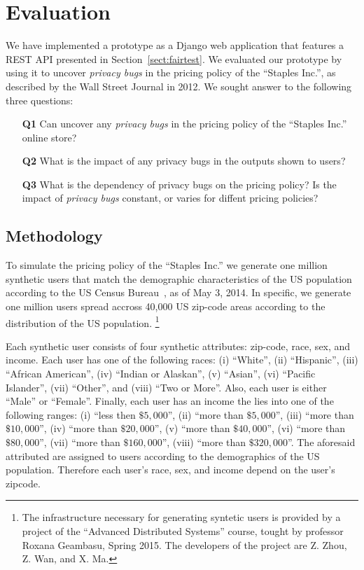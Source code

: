 \section{Evaluation}
\label{sect:evaluation}

We have implemented a \sysname prototype as a Django web application
that features a REST API presented in Section~\ref{sect:fairtest}.
We evaluated our prototype by using it to uncover {\it privacy bugs}
in the pricing policy of the ``Staples Inc.'', as described by the
Wall Street Journal in 2012. We sought answer to the following three
questions:

\begin{enumerate}
  \item[{\bf Q1}] Can \sysname uncover any {\em privacy bugs} in the
    pricing policy of the ``Staples Inc.'' online store?
  \item[{\bf Q2}] What is the impact of any privacy bugs in the outputs
    shown to users?
  \item[{\bf Q3}] What is the dependency of privacy bugs on the 
    pricing policy? Is the impact of {\em privacy bugs} constant,
    or varies for diffent pricing policies?
\end{enumerate}

\subsection{Methodology}
To simulate the pricing policy of the ``Staples Inc.'' we generate one
million synthetic users that match the demographic characteristics of
the US population according to the US Census Bureau~\cite{CensusBureau},
as of May 3, 2014. In specific, we generate one million users spread
accross 40,000 US zip-code areas according to the distribution of the US
population.
\footnote{The infrastructure necessary for generating syntetic users is
provided by a project of the ``Advanced Distributed Systems'' course,
tought by professor Roxana Geambasu, Spring 2015. The developers of the
project are Z. Zhou, Z. Wan, and X. Ma.}

Each synthetic user consists of four synthetic attributes:
zip-code, race, sex, and income. Each user has
one of the following races:  (i) ``White'', (ii) ``Hispanic'', (iii) ``African
American'', (iv) ``Indian or Alaskan'', (v) ``Asian'', (vi) ``Pacific
Islander'', (vii) ``Other'', and (viii) ``Two or More''. Also, each user is
either ``Male'' or ``Female''. Finally, each user has an income the lies
into one of the following ranges: (i) ``less then $\$5,000$'', (ii) ``more
than $\$5,000$'', (iii) ``more than $\$10,000$'', (iv) ``more than
$\$20,000$'', (v) ``more than $\$40,000$'', (vi) ``more than $\$80,000$'',
(vii) ``more than $\$160,000$'', (viii) ``more than $\$320,000$''.
The aforesaid attributed are assigned to users according to the demographics
of the US population. Therefore each user's race, sex, and income
depend on the user's zipcode.

